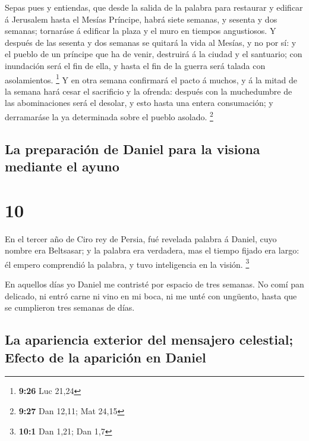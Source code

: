  Sepas pues y entiendas, que desde la salida de la
palabra para restaurar y edificar á Jerusalem hasta el Mesías Príncipe,
habrá siete semanas, y sesenta y dos semanas; tornaráse á edificar la
plaza y el muro en tiempos angustiosos.  Y después de las
sesenta y dos semanas se quitará la vida al Mesías, y no por sí: y el
pueblo de un príncipe que ha de venir, destruirá á la ciudad y el
santuario; con inundación será el fin de ella, y hasta el fin de la
guerra será talada con asolamientos. \footnote{\textbf{9:26} Luc 21,24}
 Y en otra semana confirmará el pacto á muchos, y á la
mitad de la semana hará cesar el sacrificio y la ofrenda: después con la
muchedumbre de las abominaciones será el desolar, y esto hasta una
entera consumación; y derramaráse la ya determinada sobre el pueblo
asolado. \footnote{\textbf{9:27} Dan 12,11; Mat 24,15}

\hypertarget{la-preparaciuxf3n-de-daniel-para-la-visiona-mediante-el-ayuno}{%
\subsection{La preparación de Daniel para la visiona mediante el
ayuno}\label{la-preparaciuxf3n-de-daniel-para-la-visiona-mediante-el-ayuno}}

\hypertarget{section-9}{%
\section{10}\label{section-9}}

 En el tercer año de Ciro rey de Persia, fué revelada
palabra á Daniel, cuyo nombre era Beltsasar; y la palabra era verdadera,
mas el tiempo fijado era largo: él empero comprendió la palabra, y tuvo
inteligencia en la visión. \footnote{\textbf{10:1} Dan 1,21; Dan 1,7}

 En aquellos días yo Daniel me contristé por espacio de
tres semanas.  No comí pan delicado, ni entró carne ni
vino en mi boca, ni me unté con ungüento, hasta que se cumplieron tres
semanas de días.

\hypertarget{la-apariencia-exterior-del-mensajero-celestial-efecto-de-la-apariciuxf3n-en-daniel}{%
\subsection{La apariencia exterior del mensajero celestial; Efecto de la
aparición en
Daniel}\label{la-apariencia-exterior-del-mensajero-celestial-efecto-de-la-apariciuxf3n-en-daniel}}

